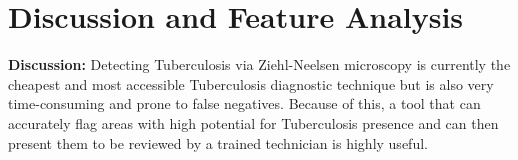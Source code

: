 \documentclass{article}
\begin{document}














\section{Discussion and Feature Analysis}
\textbf{Discussion:}
Detecting Tuberculosis via Ziehl-Neelsen microscopy is currently the cheapest and most accessible Tuberculosis 
diagnostic technique but is also very time-consuming and prone to false negatives. Because
of this, a tool that can accurately flag areas with high potential for Tuberculosis presence and can then present them 
to be reviewed by a trained technician is highly useful.
\end{document}
